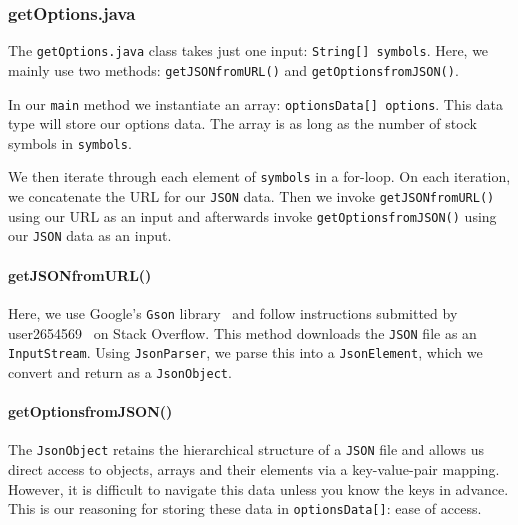 \documentclass[../Dissertation.tex]{subfiles}
\begin{document}
\subsubsection{getOptions.java}

The \lstinline|getOptions.java| class takes just one input: \lstinline|String[] symbols|.
Here, we mainly use two methods: \lstinline|getJSONfromURL()| and \lstinline|getOptionsfromJSON()|. 

In our \lstinline|main| method we instantiate an array: \lstinline|optionsData[] options|.
This data type will store our options data.
The array is as long as the number of stock symbols in \lstinline|symbols|.

We then iterate through  each element of \lstinline|symbols| in a for-loop.
On each iteration, we concatenate the URL for our \lstinline|JSON| data.
Then we invoke \lstinline|getJSONfromURL()| using our URL as an input and afterwards invoke \lstinline|getOptionsfromJSON()| using our \lstinline|JSON| data as an input.

\paragraph{getJSONfromURL()}

Here, we use Google's \lstinline|Gson| library~\cite{gson:2017} and follow instructions submitted by user2654569~\cite{user2654569:2014} on Stack Overflow.
This method downloads the \lstinline|JSON| file as an \lstinline|InputStream|.
Using \lstinline|JsonParser|, we parse this into a \lstinline|JsonElement|, which we convert and return as a \lstinline|JsonObject|.

\paragraph{getOptionsfromJSON()}

The \lstinline|JsonObject| retains the hierarchical structure of a \lstinline|JSON| file and allows us direct access to objects, arrays and their elements via a key-value-pair mapping.
However, it is difficult to navigate this data unless you know the keys in advance.
This is our reasoning for storing these data in \lstinline|optionsData[]|: ease of access.
\end{document}
